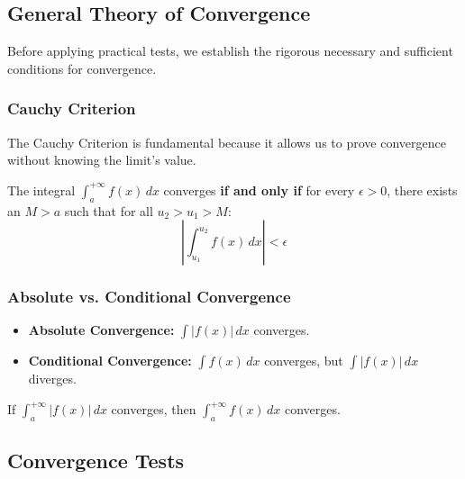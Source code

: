 \documentclass[oneside]{book}
\begin{document}
\subsection{General Theory of Convergence}

Before applying practical tests, we establish the rigorous necessary and sufficient conditions for convergence.

\subsubsection{Cauchy Criterion}
The Cauchy Criterion is fundamental because it allows us to prove convergence without knowing the limit's value.

\begin{theorem}
The integral $\int_a^{+\infty} f(x) \, dx$ converges \textbf{if and only if} for every $\epsilon > 0$, there exists an $M > a$ such that for all $u_2 > u_1 > M$:
\[
\left| \int_{u_1}^{u_2} f(x) \, dx \right| < \epsilon
\]
\end{theorem}

\subsubsection{Absolute vs. Conditional Convergence}
\begin{itemize}
    \item \textbf{Absolute Convergence:} $\int |f(x)| \, dx$ converges.
    \item \textbf{Conditional Convergence:} $\int f(x) \, dx$ converges, but $\int |f(x)| \, dx$ diverges.
\end{itemize}
\begin{theorem}
If $\int_a^{+\infty} |f(x)| \, dx$ converges, then $\int_a^{+\infty} f(x) \, dx$ converges.
\end{theorem}

\subsection{Convergence Tests}
\end{document}
